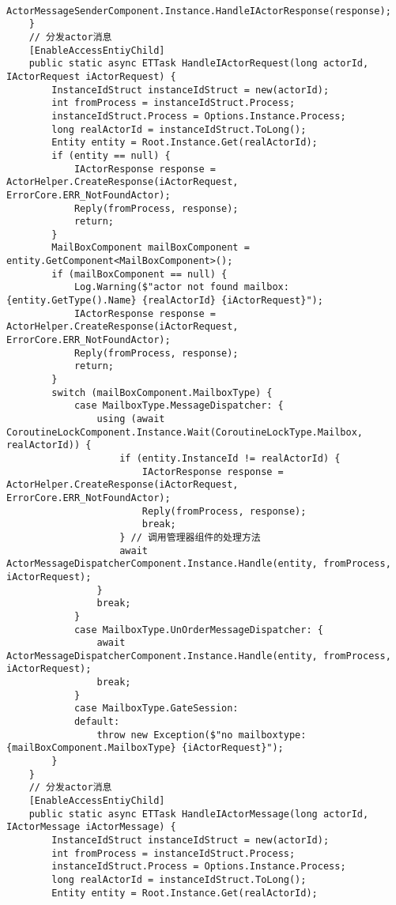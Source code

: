 \documentclass[9pt, b5paper]{article}
\begin{document}
\begin{itemize}
\begin{verbatim}
        ActorMessageSenderComponent.Instance.HandleIActorResponse(response);
    }
    // 分发actor消息
    [EnableAccessEntiyChild]
    public static async ETTask HandleIActorRequest(long actorId, IActorRequest iActorRequest) {
        InstanceIdStruct instanceIdStruct = new(actorId);
        int fromProcess = instanceIdStruct.Process;
        instanceIdStruct.Process = Options.Instance.Process;
        long realActorId = instanceIdStruct.ToLong();
        Entity entity = Root.Instance.Get(realActorId);
        if (entity == null) {
            IActorResponse response = ActorHelper.CreateResponse(iActorRequest, ErrorCore.ERR_NotFoundActor);
            Reply(fromProcess, response);
            return;
        }
        MailBoxComponent mailBoxComponent = entity.GetComponent<MailBoxComponent>();
        if (mailBoxComponent == null) {
            Log.Warning($"actor not found mailbox: {entity.GetType().Name} {realActorId} {iActorRequest}");
            IActorResponse response = ActorHelper.CreateResponse(iActorRequest, ErrorCore.ERR_NotFoundActor);
            Reply(fromProcess, response);
            return;
        }
        switch (mailBoxComponent.MailboxType) {
            case MailboxType.MessageDispatcher: {
                using (await CoroutineLockComponent.Instance.Wait(CoroutineLockType.Mailbox, realActorId)) {
                    if (entity.InstanceId != realActorId) {
                        IActorResponse response = ActorHelper.CreateResponse(iActorRequest, ErrorCore.ERR_NotFoundActor);
                        Reply(fromProcess, response);
                        break;
                    } // 调用管理器组件的处理方法 
                    await ActorMessageDispatcherComponent.Instance.Handle(entity, fromProcess, iActorRequest);
                }
                break;
            }
            case MailboxType.UnOrderMessageDispatcher: {
                await ActorMessageDispatcherComponent.Instance.Handle(entity, fromProcess, iActorRequest);
                break;
            }
            case MailboxType.GateSession:
            default:
                throw new Exception($"no mailboxtype: {mailBoxComponent.MailboxType} {iActorRequest}");
        }
    }
    // 分发actor消息
    [EnableAccessEntiyChild]
    public static async ETTask HandleIActorMessage(long actorId, IActorMessage iActorMessage) {
        InstanceIdStruct instanceIdStruct = new(actorId);
        int fromProcess = instanceIdStruct.Process;
        instanceIdStruct.Process = Options.Instance.Process;
        long realActorId = instanceIdStruct.ToLong();
        Entity entity = Root.Instance.Get(realActorId);

\end{verbatim}
\end{itemize}
\end{document}
